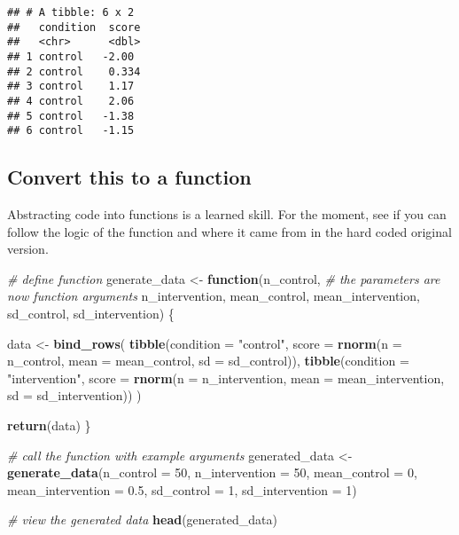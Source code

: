 \documentclass[
]{article}
\newenvironment{Shaded}{\begin{snugshade}}{\end{snugshade}}
\newcommand{\AttributeTok}[1]{\textcolor[rgb]{0.13,0.29,0.53}{#1}}
\newcommand{\CommentTok}[1]{\textcolor[rgb]{0.56,0.35,0.01}{\textit{#1}}}
\newcommand{\ControlFlowTok}[1]{\textcolor[rgb]{0.13,0.29,0.53}{\textbf{#1}}}
\newcommand{\DecValTok}[1]{\textcolor[rgb]{0.00,0.00,0.81}{#1}}
\newcommand{\FloatTok}[1]{\textcolor[rgb]{0.00,0.00,0.81}{#1}}
\newcommand{\FunctionTok}[1]{\textcolor[rgb]{0.13,0.29,0.53}{\textbf{#1}}}
\newcommand{\NormalTok}[1]{#1}
\newcommand{\OtherTok}[1]{\textcolor[rgb]{0.56,0.35,0.01}{#1}}
\newcommand{\StringTok}[1]{\textcolor[rgb]{0.31,0.60,0.02}{#1}}
\begin{document}
\begin{verbatim}
## # A tibble: 6 x 2
##   condition  score
##   <chr>      <dbl>
## 1 control   -2.00 
## 2 control    0.334
## 3 control    1.17 
## 4 control    2.06 
## 5 control   -1.38 
## 6 control   -1.15
\end{verbatim}

\hypertarget{convert-this-to-a-function}{%
\subsection{Convert this to a
function}\label{convert-this-to-a-function}}

Abstracting code into functions is a learned skill. For the moment, see
if you can follow the logic of the function and where it came from in
the hard coded original version.

\begin{Shaded}
\begin{Highlighting}[]
\CommentTok{\# define function}
\NormalTok{generate\_data }\OtherTok{\textless{}{-}} \ControlFlowTok{function}\NormalTok{(n\_control, }\CommentTok{\# the parameters are now function arguments}
\NormalTok{                          n\_intervention,}
\NormalTok{                          mean\_control,}
\NormalTok{                          mean\_intervention,}
\NormalTok{                          sd\_control,}
\NormalTok{                          sd\_intervention) \{}
  
\NormalTok{  data }\OtherTok{\textless{}{-}} 
    \FunctionTok{bind\_rows}\NormalTok{(}
      \FunctionTok{tibble}\NormalTok{(}\AttributeTok{condition =} \StringTok{"control"}\NormalTok{,}
             \AttributeTok{score =} \FunctionTok{rnorm}\NormalTok{(}\AttributeTok{n =}\NormalTok{ n\_control, }\AttributeTok{mean =}\NormalTok{ mean\_control, }\AttributeTok{sd =}\NormalTok{ sd\_control)),}
      \FunctionTok{tibble}\NormalTok{(}\AttributeTok{condition =} \StringTok{"intervention"}\NormalTok{,}
             \AttributeTok{score =} \FunctionTok{rnorm}\NormalTok{(}\AttributeTok{n =}\NormalTok{ n\_intervention, }\AttributeTok{mean =}\NormalTok{ mean\_intervention, }\AttributeTok{sd =}\NormalTok{ sd\_intervention))}
\NormalTok{    ) }
  
  \FunctionTok{return}\NormalTok{(data)}
\NormalTok{\}}
  
\CommentTok{\# call the function with example arguments}
\NormalTok{generated\_data }\OtherTok{\textless{}{-}} \FunctionTok{generate\_data}\NormalTok{(}\AttributeTok{n\_control =} \DecValTok{50}\NormalTok{,}
                                \AttributeTok{n\_intervention =} \DecValTok{50}\NormalTok{,}
                                \AttributeTok{mean\_control =} \DecValTok{0}\NormalTok{,}
                                \AttributeTok{mean\_intervention =} \FloatTok{0.5}\NormalTok{,}
                                \AttributeTok{sd\_control =} \DecValTok{1}\NormalTok{,}
                                \AttributeTok{sd\_intervention =} \DecValTok{1}\NormalTok{)}

\CommentTok{\# view the generated data}
\FunctionTok{head}\NormalTok{(generated\_data)}
\end{Highlighting}
\end{Shaded}
\end{document}
